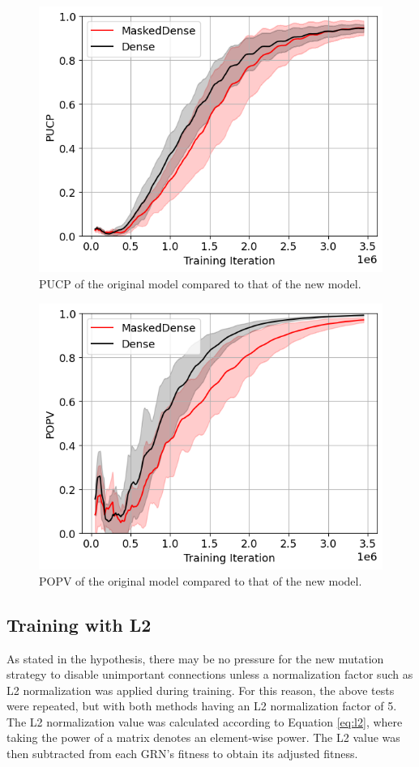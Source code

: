 \documentclass[twocolumn,a4paper,11pt]{article}
\begin{document}
    \begin{figure}[h]
        \centering
        \includegraphics[width=0.7\linewidth]{ex-img/final-nol2-pucp.png}
        \caption{PUCP of the original model compared to that of the new model.} \label{fig:ex-A}
    \end{figure}

    \begin{figure}[h]
        \centering
        \includegraphics[width=0.7\linewidth]{ex-img/final-nol2-popv.png}
        \caption{POPV of the original model compared to that of the new model.} \label{fig:ex-A2}
    \end{figure}

    \subsection{Training with L2}

    As stated in the hypothesis, there may be no pressure for the new mutation strategy to disable unimportant connections unless a normalization factor such as L2 normalization was applied during training. For this reason, the above tests were repeated, but with both methods having an L2 normalization factor of 5. The L2 normalization value was calculated according to Equation \ref{eq:l2}, where taking the power of a matrix denotes an element-wise power. The L2 value was then subtracted from each GRN's fitness to obtain its adjusted fitness.
\end{document}
